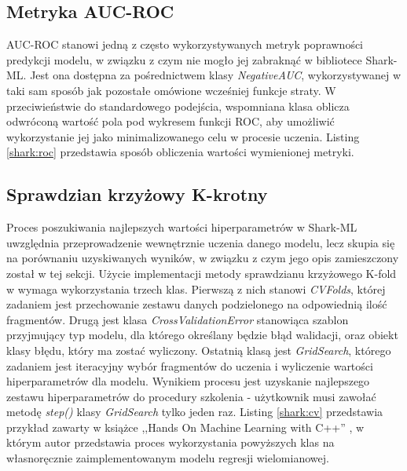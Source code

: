 
\subsection{Metryka AUC-ROC}

AUC-ROC stanowi jedną z często wykorzystywanych metryk poprawności predykcji modelu, w związku z czym nie mogło jej zabraknąć w bibliotece Shark-ML. Jest ona dostępna za pośrednictwem klasy \textit{NegativeAUC}, wykorzystywanej w taki sam sposób jak pozostałe omówione wcześniej funkcje straty. W przeciwieństwie do standardowego podejścia, wspomniana klasa oblicza odwróconą wartość pola pod wykresem funkcji ROC, aby umożliwić wykorzystanie jej jako minimalizowanego celu w procesie uczenia. Listing \ref{shark:roc} przedstawia sposób obliczenia wartości wymienionej metryki.


\subsection{Sprawdzian krzyżowy K-krotny}

Proces poszukiwania najlepszych wartości hiperparametrów w Shark-ML uwzględnia przeprowadzenie wewnętrznie uczenia danego modelu, lecz skupia się na porównaniu uzyskiwanych wyników, w związku z czym jego opis zamieszczony został w tej sekcji. Użycie implementacji metody sprawdzianu krzyżowego K-fold w wymaga wykorzystania trzech klas. Pierwszą z nich stanowi \textit{CVFolds}, której zadaniem jest przechowanie zestawu danych podzielonego na odpowiednią ilość fragmentów. Drugą jest klasa \textit{CrossValidationError} stanowiąca szablon przyjmujący typ modelu, dla którego określany będzie błąd walidacji, oraz obiekt klasy błędu, który ma zostać wyliczony. Ostatnią klasą jest \textit{GridSearch}, którego zadaniem jest iteracyjny wybór fragmentów do uczenia i wyliczenie wartości hiperparametrów dla modelu. Wynikiem procesu jest uzyskanie najlepszego zestawu hiperparametrów do procedury szkolenia - użytkownik musi zawołać metodę \textit{step()} klasy \textit{GridSearch} tylko jeden raz. Listing \ref{shark:cv} przedstawia przykład zawarty w książce ,,Hands On Machine Learning with C++'' \cite{handsOnMachineLearning}, w którym autor przedstawia proces wykorzystania powyższych klas na własnoręcznie zaimplementowanym modelu regresji wielomianowej. 

